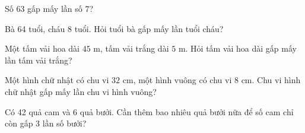 \begin{ex} %
Số 63 gấp mấy lần số 7?
\end{ex}

\begin{ex} %
Bà 64 tuổi, cháu 8 tuổi. Hỏi tuổi bà gấp mấy lần tuổi cháu?
\end{ex}

\begin{ex} %
Một tấm vải hoa dài $45\text{ m}$, tấm vải trắng dài $5\text{ m}$. Hỏi tấm vải hoa dài gấp mấy lần tấm vải trắng?
\end{ex}

\begin{ex} %
Một hình chữ nhật có chu vi $32\text{ cm}$, một hình vuông có chu vi $8\text{ cm}$. Chu vi hình chữ nhật gấp mấy lần chu vi hình vuông?
\end{ex}

\begin{ex} %
Có 42 quả cam và 6 quả bưởi. Cần thêm bao nhiêu quả bưởi nữa để số cam chỉ còn gấp 3 lần số bưởi?
\end{ex}
